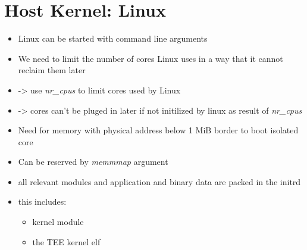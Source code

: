 \section{Host Kernel: Linux}
\begin{itemize}
    \item Linux can be started with command line arguments
    \item We need to limit the number of cores Linux uses in a way that it cannot
          reclaim them later
    \item -> use \textit{nr\_cpus} to limit cores used by Linux
    \item -> cores can't be pluged in later if not initilized by linux as result of \textit{nr\_cpus}
    \item Need for memory with physical address below 1 MiB border to boot isolated core
    \item Can be reserved by \textit{memmmap} argument
    \item all relevant modules and application and binary data are packed in the initrd
    \item this includes:
          \begin{itemize}
              \item kernel module
              \item the TEE kernel elf
          \end{itemize}
\end{itemize}

